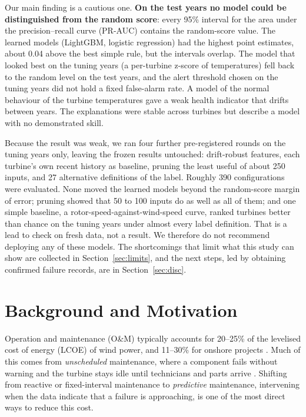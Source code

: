 \documentclass[12pt,a4paper]{article}
\begin{document}
	Our main finding is a cautious one. \textbf{On the test years no model could be distinguished from the random score}: every 95\% interval for the area under the precision--recall curve (PR-AUC) contains the random-score value. The learned models (LightGBM, logistic regression) had the highest point estimates, about 0.04 above the best simple rule, but the intervals overlap. The model that looked best on the tuning years (a per-turbine z-score of temperatures) fell back to the random level on the test years, and the alert threshold chosen on the tuning years did not hold a fixed false-alarm rate. A model of the normal behaviour of the turbine temperatures gave a weak health indicator that drifts between years. The explanations were stable across turbines but describe a model with no demonstrated skill.

	Because the result was weak, we ran four further pre-registered rounds on the tuning years only, leaving the frozen results untouched: drift-robust features, each turbine's own recent history as baseline, pruning the least useful of about 250 inputs, and 27 alternative definitions of the label. Roughly 390 configurations were evaluated. None moved the learned models beyond the random-score margin of error; pruning showed that 50 to 100 inputs do as well as all of them; and one simple baseline, a rotor-speed-against-wind-speed curve, ranked turbines better than chance on the tuning years under almost every label definition. That is a lead to check on fresh data, not a result. We therefore do not recommend deploying any of these models. The shortcomings that limit what this study can show are collected in Section~\ref{sec:limits}, and the next steps, led by obtaining confirmed failure records, are in Section~\ref{sec:disc}.

	\newpage

	\tableofcontents
	\newpage
	\setcounter{page}{1}

	\section{Background and Motivation}\label{sec:intro}

	Operation and maintenance (O\&M) typically accounts for 20--25\% of the levelised cost of energy (LCOE) of wind power, and 11--30\% for onshore projects \cite{irena2012}. Much of this comes from \emph{unscheduled} maintenance, where a component fails without warning and the turbine stays idle until technicians and parts arrive \cite{carroll2016}. Shifting from reactive or fixed-interval maintenance to \emph{predictive} maintenance, intervening when the data indicate that a failure is approaching, is one of the most direct ways to reduce this cost.
\end{document}
